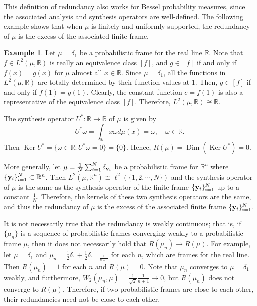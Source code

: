\documentclass{amsart}
\numberwithin{equation}{section}
\DeclareMathOperator{\kernel}{Ker}
\DeclareMathOperator{\Dim}{Dim}
\newcommand{\bR}{\mathbb R}
\theoremstyle{plain}
\theoremstyle{remark}
\theoremstyle{definition}
\newtheorem{example}[theorem]{Example}
\begin{document}
This definition of redundancy also works for Bessel probability measures, since the associated analysis and synthesis operators are well-defined. The following example shows that when $\mu$ is finitely and uniformly supported, the redundancy of $\mu$ is the excess of the associated finite frame. 
\begin{example}
\normalfont
    Let $\mu = \delta_1$ be a probabilistic frame for the real line $\mathbb{R}$. Note that $f \in L^2(\mu, \mathbb{R})$ is really an equivalence class $[f]$, and $g \in [f]$ if and only if $f(x)=g(x)$ for $\mu$ almost all $x \in \mathbb{R}$. Since $\mu = \delta_1$, all the functions in $L^2(\mu, \mathbb{R})$ are totally determined by their function values at $1$. Then,  $g \in [f]$ if and only if $f(1)=g(1)$.  Clearly, the constant function $c=f(1)$ is also a representative of the equivalence class $[f]$. Therefore, $L^2(\mu, \mathbb{R}) \cong \mathbb{R}$.
    
   The synthesis operator $U^*: \mathbb{R} \rightarrow \mathbb{R}$ of $\mu$ is given by 
$$U^* \omega = \int_{\mathbb{R}} x \omega d\mu(x) = \omega, \quad \omega \in \mathbb{R}.$$
Then $\kernel U^* = \{\omega \in \mathbb{R}: U^*\omega =0\} = \{0\}$. Hence, $R(\mu) =\Dim(\kernel U^*) = 0$.

More generally, let $\mu = \frac{1}{N}\sum_{i=1}^N \delta_{{\bf y}_i}$ be a probabilistic frame for $\bR^n$ where $\{{\bf y}_i\}_{i=1}^N\subset\bR^n$.  Then $L^2(\mu, \mathbb{R}^n) \cong \ell^2(\{1, 2, \cdots, N\})$ and the synthesis operator of $\mu$ is the same as the synthesis operator of the finite frame $\{{\bf y}_i\}_{i=1}^N$ up to a constant $\frac{1}{N}$. Therefore, the kernels of these two synthesis operators are the same, and thus the redundancy of $\mu$ is the excess of the associated finite frame $\{{\bf y}_i\}_{i=1}^N$. 
\end{example} 

It is not necessarily true that the redundancy is weakly continuous; that is, if $\{\mu_n\}$ is a sequence of probabilistic frames converging weakly to a probabilistic frame $\mu$, then it does not necessarily hold that $R(\mu_n) \rightarrow R(\mu)$.
For example, let $\mu = \delta_1 $ and $\mu_n = \frac{1}{2}\delta_1 + \frac{1}{2} \delta_{1 -\frac{1}{n+1}}$ for each $n$, which are frames for the real line. Then $R(\mu_n) = 1$ for each $n$ and $R(\mu) = 0$. Note that $\mu_n$ converges to $\mu = \delta_1 $ weakly, and furthermore, $W_2(\mu_n, \mu) = \frac{1}{\sqrt{2}}\frac{1}{n+1} \rightarrow 0$, but $R(\mu_n)$ does not converge to $R(\mu)$. Therefore, if two probabilistic frames are close to each other, their redundancies need not be close to each other.
\end{document}
